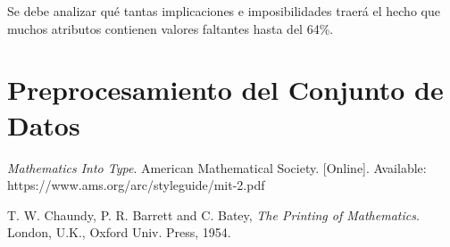 \documentclass[lettersize,journal]{IEEEtran}
\begin{document}
Se debe analizar qué tantas implicaciones e imposibilidades traerá el hecho que muchos atributos contienen valores faltantes hasta del 64\%.


\section{Preprocesamiento del Conjunto de Datos}


\begin{thebibliography}{1}


{\it{Mathematics Into Type}}. American Mathematical Society. [Online]. Available: https://www.ams.org/arc/styleguide/mit-2.pdf

T. W. Chaundy, P. R. Barrett and C. Batey, {\it{The Printing of Mathematics}}. London, U.K., Oxford Univ. Press, 1954.

\end{thebibliography}


\newpage



\vfill
\end{document}
